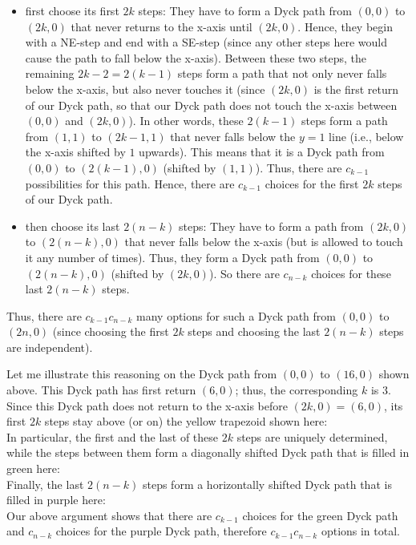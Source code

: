 \begin{itemize}
\item first choose its first $2k$ steps: They have to form a Dyck path from
$\left(  0,0\right)  $ to $\left(  2k,0\right)  $ that never returns to the
x-axis until $\left(  2k,0\right)  $. Hence, they begin with a NE-step and end
with a SE-step (since any other steps here would cause the path to fall below
the x-axis). Between these two steps, the remaining $2k-2=2\left(  k-1\right)
$ steps form a path that not only never falls below the x-axis, but also never
touches it (since $\left(  2k,0\right)  $ is the first return of our Dyck
path, so that our Dyck path does not touch the x-axis between $\left(
0,0\right)  $ and $\left(  2k,0\right)  $). In other words, these $2\left(
k-1\right)  $ steps form a path from $\left(  1,1\right)  $ to $\left(
2k-1,1\right)  $ that never falls below the $y=1$ line (i.e., below the x-axis
shifted by $1$ upwards). This means that it is a Dyck path from $\left(
0,0\right)  $ to $\left(  2\left(  k-1\right)  ,0\right)  $ (shifted by
$\left(  1,1\right)  $). Thus, there are $c_{k-1}$ possibilities for this
path. Hence, there are $c_{k-1}$ choices for the first $2k$ steps of our Dyck path.

\item then choose its last $2\left(  n-k\right)  $ steps: They have to form a
path from $\left(  2k,0\right)  $ to $\left(  2\left(  n-k\right)  ,0\right)
$ that never falls below the x-axis (but is allowed to touch it any number of
times). Thus, they form a Dyck path from $\left(  0,0\right)  $ to $\left(
2\left(  n-k\right)  ,0\right)  $ (shifted by $\left(  2k,0\right)  $). So
there are $c_{n-k}$ choices for these last $2\left(  n-k\right)  $ steps.
\end{itemize}

Thus, there are $c_{k-1}c_{n-k}$ many options for such a Dyck path from
$\left(  0,0\right)  $ to $\left(  2n,0\right)  $ (since choosing the first
$2k$ steps and choosing the last $2\left(  n-k\right)  $ steps are independent).

Let me illustrate this reasoning on the Dyck path from $\left(  0,0\right)  $
to $\left(  16,0\right)  $ shown above. This Dyck path has first return
$\left(  6,0\right)  $; thus, the corresponding $k$ is $3$. Since this Dyck
path does not return to the x-axis before $\left(  2k,0\right)  =\left(
6,0\right)  $, its first $2k$ steps stay above (or on) the yellow trapezoid
shown here:%
\[%
\]
In particular, the first and the last of these $2k$ steps are uniquely
determined, while the steps between them form a diagonally shifted Dyck path
that is filled in green here:%
\[%
\]
Finally, the last $2\left(  n-k\right)  $ steps form a horizontally shifted
Dyck path that is filled in purple here:%
\[%
\]
Our above argument shows that there are $c_{k-1}$ choices for the green Dyck
path and $c_{n-k}$ choices for the purple Dyck path, therefore $c_{k-1}%
c_{n-k}$ options in total.


